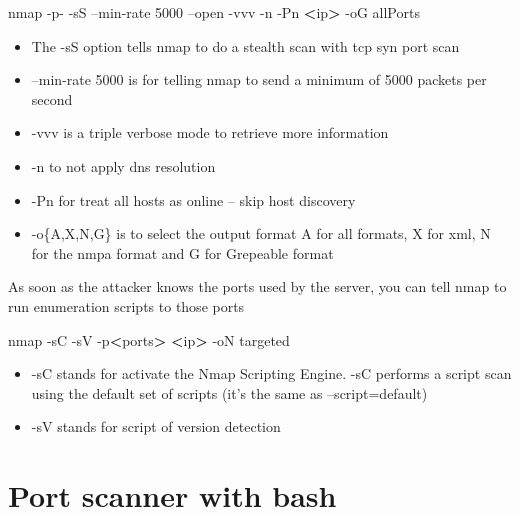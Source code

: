 \documentclass{assets/ipesethesis}
\newenvironment{Shaded}{\begin{snugshade}}{\end{snugshade}}
\newcommand{\FunctionTok}[1]{\textcolor[rgb]{0.00,0.00,0.00}{#1}}
\newcommand{\NormalTok}[1]{#1}
\newcommand{\OperatorTok}[1]{\textcolor[rgb]{0.81,0.36,0.00}{\textbf{#1}}}
\providecommand{\tightlist}{%
  \setlength{\itemsep}{0pt}\setlength{\parskip}{0pt}}
\begin{document}
\begin{Shaded}
\begin{Highlighting}[]
\FunctionTok{nmap}\NormalTok{ -p- -sS --min-rate 5000 --open -vvv -n -Pn }\OperatorTok{<}\NormalTok{ip}\OperatorTok{>}\NormalTok{ -oG allPorts}
\end{Highlighting}
\end{Shaded}

\begin{itemize}
\tightlist
\item
  The -sS option tells nmap to do a stealth scan with tcp syn port scan
\item
  --min-rate 5000 is for telling nmap to send a minimum of 5000 packets per second
\item
  -vvv is a triple verbose mode to retrieve more information
\item
  -n to not apply dns resolution
\item
  -Pn for treat all hosts as online -- skip host discovery
\item
  -o\{A,X,N,G\} is to select the output format A for all formats, X for xml, N for the nmpa format and G for Grepeable format
\end{itemize}

As soon as the attacker knows the ports used by the server, you can tell nmap to run enumeration scripts to those ports

\begin{Shaded}
\begin{Highlighting}[]
\FunctionTok{nmap}\NormalTok{ -sC -sV -p}\OperatorTok{<}\NormalTok{ports}\OperatorTok{>} \OperatorTok{<}\NormalTok{ip}\OperatorTok{>}\NormalTok{ -oN targeted}
\end{Highlighting}
\end{Shaded}

\begin{itemize}
\tightlist
\item
  -sC stands for activate the Nmap Scripting Engine. -sC performs a script scan using the default set of scripts (it's the same as --script=default)
\item
  -sV stands for script of version detection
\end{itemize}

\hypertarget{port-scanner-with-bash}{%
\section*{Port scanner with bash}\label{port-scanner-with-bash}}
\end{document}
